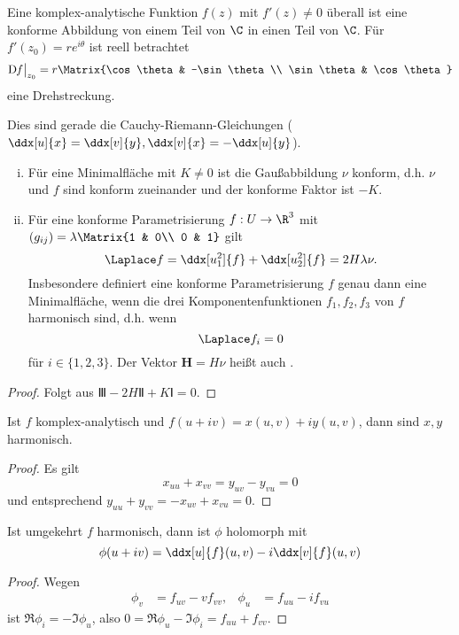 \begin{nt}
	Eine komplex-analytische Funktion $f(z)$ mit $f'(z) \neq 0$ überall ist eine konforme Abbildung von einem Teil von $\C$ in einen Teil von $\C$.
	Für $f'(z_0) = r e^{i\theta}$ ist reell betrachtet
	\[
		\Df \big|_{z_0} = r \Matrix{\cos \theta & -\sin \theta \\ \sin \theta & \cos \theta}
	\]
	eine Drehstreckung.

	Dies sind gerade die Cauchy-Riemann-Gleichungen ($\ddx[u]{x} = \ddx[v]{y}, \ddx[v]{x} = - \ddx[u]{y}$).
\end{nt}

\begin{kor}
	\begin{enumerate}[(i)]
		\item
			Für eine Minimalfläche mit $K \neq 0$ ist die Gaußabbildung $\nu$ konform, d.h. $\nu$ und $f$ sind konform zueinander und der konforme Faktor ist $-K$.
		\item
			Für eine konforme Parametrisierung $f: U \to \R^3$ mit $(g_{ij}) = \lambda \Matrix{1 & 0\\ 0 & 1}$ gilt
			\[
				\Laplace f = \ddx[u_1^2]{f} + \ddx[u_2^2]{f} = 2 H \lambda \nu.
			\]
			Insbesondere definiert eine konforme Parametrisierung $f$ genau dann eine Minimalfläche, wenn die drei Komponentenfunktionen $f_1, f_2, f_3$ von $f$ harmonisch sind, d.h. wenn
			\[
				\Laplace f_i = 0
			\]
			für $i \in \{1, 2, 3\}$.
			Der Vektor $\mathbf H = H \nu$ heißt auch .
	\end{enumerate}
	\begin{proof}
		Folgt aus $Ⅲ - 2HⅡ + KⅠ = 0$.
	\end{proof}
\end{kor}

\begin{kor}
	Ist $f$ komplex-analytisch und $f(u+iv) = x(u,v) + iy(u,v)$, dann sind $x, y$ harmonisch.
	\begin{proof}
		Es gilt
		\[
			x_{uu} + x_{vv} = y_{uv} - y_{vu} = 0
		\]
		und entsprechend $y_{uu} + y_{vv} = -x_{uv} + x_{vu} = 0$.
	\end{proof}
\end{kor}

\begin{st}
	Ist umgekehrt $f$ harmonisch, dann ist $\phi$ holomorph mit
	\[
		\phi(u + iv) = \ddx[u]{f}(u,v) - i \ddx[v]{f}(u,v)
	\]
	\begin{proof}
		Wegen
		\begin{align*}
			\phi_v &= f_{uv} - v f_{vv}, &
			\phi_u &= f_{uu} - i f_{vu}
		\end{align*}
		ist $\Re \phi_i = - \Im \phi_u$, also $0 = \Re \phi_u - \Im \phi_i = f_{uu} + f_{vv}$.
	\end{proof}
\end{st}

